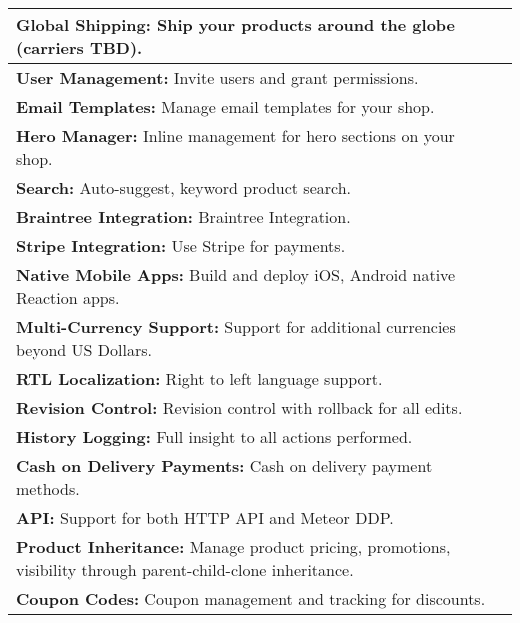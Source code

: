 \begin{table}[h!]
\begin{tabular}{ |L{0.6\paperwidth}|L{0.1\paperwidth}|}
\\ \hline
	\textbf{ Global Shipping:} Ship your products around the globe (carriers TBD).&
	
\\ \hline
	\textbf{ User Management:} Invite users and grant permissions.&
	
\\ \hline
	\textbf{ Email Templates:} Manage email templates for your shop.&
	
\\ \hline
	\textbf{ Hero Manager:} Inline management for hero sections on your shop.&
	
\\ \hline
	\textbf{ Search:} Auto-suggest, keyword product search.&
	
\\ \hline
	\textbf{ Braintree Integration:} Braintree Integration.&
	
\\ \hline
	\textbf{ Stripe Integration:} Use Stripe for payments.&
	
\\ \hline
	\textbf{ Native Mobile Apps:} Build and deploy iOS, Android native Reaction apps.&
	
\\ \hline
	\textbf{ Multi-Currency Support:} Support for additional currencies beyond US Dollars.&
	
\\ \hline
	\textbf{ RTL Localization:} Right to left language support.&
	
\\ \hline
	\textbf{ Revision Control:} Revision control with rollback for all edits.&
	
\\ \hline
	\textbf{ History Logging:} Full insight to all actions performed.&
	
\\ \hline
	\textbf{ Cash on Delivery Payments:} Cash on delivery payment methods.&
	
\\ \hline
	\textbf{ API:} Support for both HTTP API and Meteor DDP.&
	
\\ \hline
	\textbf{ Product Inheritance:} Manage product pricing, promotions, visibility through parent-child-clone inheritance.&
	
\\ \hline
	\textbf{ Coupon Codes:} Coupon management and tracking for discounts.&
	

\end{tabular}
\end{table}
